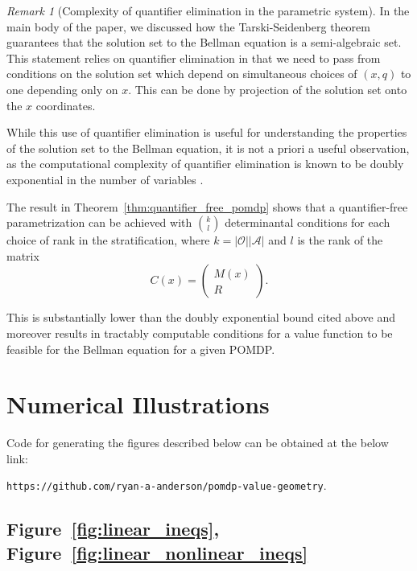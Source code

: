 \documentclass{article}
\theoremstyle{definition}
\theoremstyle{remark}
\newtheorem{remark}[theorem]{Remark}
\begin{document}
\begin{remark}[Complexity of quantifier elimination in the parametric system]
    In the main body of the paper, we discussed how the Tarski-Seidenberg theorem guarantees that the solution set to the Bellman equation is a semi-algebraic set. This statement relies on quantifier elimination in that we need to pass from conditions on the solution set which depend on simultaneous choices of $(x, q)$ to one depending only on $x$. This can be done by projection of the solution set onto the $x$ coordinates. 
    
    While this use of quantifier elimination is useful for understanding the properties of the solution set to the Bellman equation, it is not a priori a useful observation, as the computational complexity of quantifier elimination is known to be doubly exponential in the number of variables \citep[Chapter 14]{BasuPollackRoy}.
    
    The result in Theorem~\ref{thm:quantifier_free_pomdp} shows that a quantifier-free parametrization can be achieved with $k \choose l$ determinantal conditions for each choice of rank in the stratification, where $k = \vert \mathcal{O} \vert \vert \mathcal{A} \vert$ and $l$ is the rank of the matrix 
    $$
    C(x) = \begin{pmatrix}
        M(x) \\ R
    \end{pmatrix}.
    $$ 
    
    This is substantially lower than the doubly exponential bound cited above and moreover results in tractably computable conditions for a value function to be feasible for the Bellman equation for a given POMDP.
        
\end{remark} 

\newpage

\section{Numerical Illustrations}   
\label{app:details-experiments}

Code for generating the figures described below can be obtained at the below link: 

\texttt{https://github.com/ryan-a-anderson/pomdp-value-geometry}.

\subsection{Figure~\ref{fig:linear_ineqs}, Figure~\ref{fig:linear_nonlinear_ineqs}} 
\end{document}
